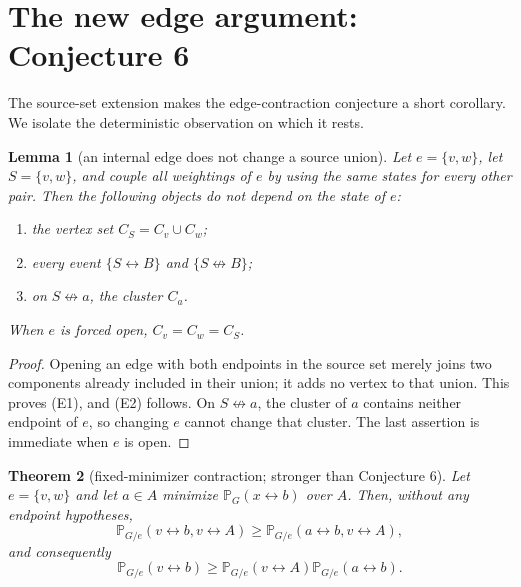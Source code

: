 \documentclass[11pt]{article}
\newtheorem{theorem}{Theorem}[section]
\newtheorem{lemma}[theorem]{Lemma}
\theoremstyle{definition}
\theoremstyle{remark}
\newcommand{\PP}{\mathbb P}
\newcommand{\con}{\leftrightarrow}
\newcommand{\ncon}{\not\leftrightarrow}
\begin{document}
\section{The new edge argument: Conjecture 6}\label{sec:C6}

The source-set extension makes the edge-contraction conjecture a short
corollary.  We isolate the deterministic observation on which it rests.

\begin{lemma}[an internal edge does not change a source union]\label{lem:internal}
Let $e=\{v,w\}$, let $S=\{v,w\}$, and couple all weightings of $e$ by
using the same states for every other pair.  Then the following objects do
not depend on the state of $e$:
\begin{enumerate}[label=\textup{(E\arabic*)},leftmargin=3em]
\item the vertex set $C_S=C_v\cup C_w$;
\item every event $\{S\con B\}$ and $\{S\ncon B\}$;
\item on $S\ncon a$, the cluster $C_a$.
\end{enumerate}
When $e$ is forced open, $C_v=C_w=C_S$.
\end{lemma}

\begin{proof}
Opening an edge with both endpoints in the source set merely joins two
components already included in their union; it adds no vertex to that
union.  This proves (E1), and (E2) follows.  On $S\ncon a$, the cluster of
$a$ contains neither endpoint of $e$, so changing $e$ cannot change that
cluster.  The last assertion is immediate when $e$ is open.
\end{proof}

\begin{theorem}[fixed-minimizer contraction; stronger than Conjecture 6]
\label{thm:C6strong}
Let $e=\{v,w\}$ and let $a\in A$ minimize $\PP_G(x\con b)$ over $A$.
Then, without any endpoint hypotheses,
\begin{equation}\label{eq:pinned-preFKG}
 \PP_{G/e}(v\con b,v\con A)
 \geq \PP_{G/e}(a\con b,v\con A),
\end{equation}
and consequently
\begin{equation}\label{eq:C6proved}
 \PP_{G/e}(v\con b)
 \geq\PP_{G/e}(v\con A)\PP_{G/e}(a\con b).
\end{equation}
\end{theorem}
\end{document}
